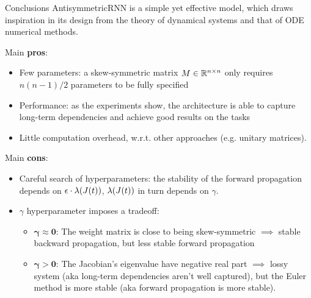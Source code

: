 \documentclass[10pt,xcolor={table,dvipsnames}]{beamer} 		%
\theoremstyle{plain}					%
\theoremstyle{definition}
\theoremstyle{remark}
\begin{document}
	\begin{frame}{Conclusions}
		AntisymmetricRNN is a simple yet effective model, which draws inspiration in its design
		from the theory of dynamical systems and that of ODE numerical methods. 
		\medskip 

		Main \textbf{pros}:
		\begin{itemize}
			\item Few parameters: a skew-symmetric matrix $M\in\R{n}{n}$ only requires $n(n-1)/2$ 
			parameters to be fully specified
			\item Performance: as the experiments show, the architecture is able to capture long-term 
			dependencies and achieve good results on the tasks
			\item Little computation overhead, w.r.t. other approaches 
			{\smaller (e.g. unitary matrices)}.
		\end{itemize}

		Main \textbf{cons}:
		\begin{itemize}
			\item Careful search of hyperparameters: {\smaller the stability of the forward 
			propagation depends on $\epsilon\cdot\lambda\qty(J(t))$, 
			$\lambda\qty(J(t))$ in turn depends on $\gamma$.}
			\item $\gamma$ hyperparameter imposes a tradeoff:
			\begin{itemize}
				\item {$\bm{\gamma\approx 0}$}: The weight matrix is close to being skew-symmetric
				$\implies$ stable backward propagation, but less stable forward propagation
				\item {$\bm{\gamma>0}$}: The Jacobian's eigenvalue have negative real part 
				$\implies$ lossy system (aka long-term dependencies aren't well captured), 
				but the Euler method is more stable (aka forward propagation is more stable). 
			\end{itemize} 
		\end{itemize}
	\end{frame}
\end{document}
